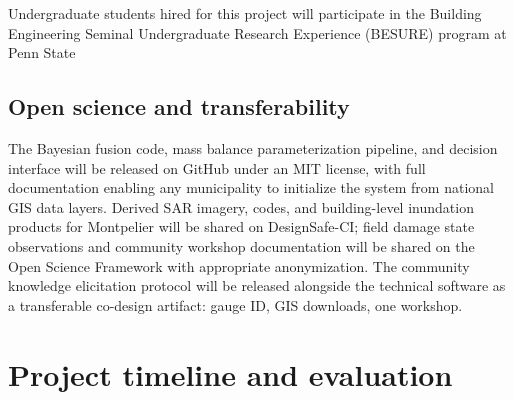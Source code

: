 \documentclass[11pt]{article}
\begin{document}
Undergraduate students hired for this project will participate in the Building
Engineering Seminal Undergraduate Research Experience (BESURE) program at Penn State

\vspace{-10pt}
\subsection{Open science and transferability}
The Bayesian fusion code, mass balance parameterization pipeline, and decision
interface will be released on GitHub under an MIT license, with full documentation
enabling any municipality to initialize the system from national GIS data layers.
Derived SAR imagery, codes, and building-level inundation products for Montpelier will be shared on
DesignSafe-CI; field damage state observations and community workshop documentation
will be shared on the Open Science Framework with appropriate anonymization.
The community knowledge elicitation protocol will be released alongside the technical
software as a transferable co-design artifact: gauge ID, GIS downloads, one workshop.


\section{Project timeline and evaluation}
\end{document}
